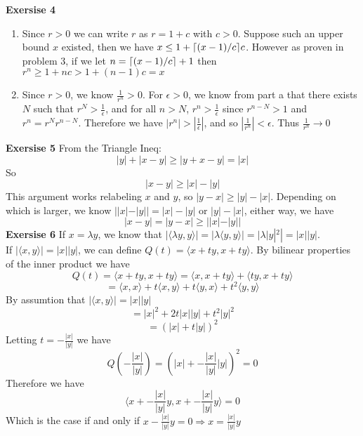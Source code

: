 \documentclass[12pt]{article}
\newcounter{ques}[section]
\newenvironment{ques}[1]{\textbf{Exersise #1} \vspace{1mm}}{\medskip}
\theoremstyle{definition}
\DeclarePairedDelimiter{\ceil}{\lceil}{\rceil}
\begin{document}
\begin{ques}{4}
\begin{enumerate}
		\item
			Since $r>0$ we can write $r$ as $r = 1 + c$ with $c >
			0$. Suppose such an upper bound $x$ existed, then we
			have $x \leq 1 + \ceil{(x - 1)/c}c$. However as proven
			in problem 3, if we let $n = \ceil{(x - 1)/c} + 1$ then
			$r^n \geq 1 + nc > 1 + (n - 1)c = x$
		\item
			Since $r > 0$, we know $\frac 1 {r^n} > 0$. For
			$\epsilon > 0$, we know from part a that there exists
			$N$ such that $r^N > \frac 1 \epsilon$, and for all $n
			> N$, $r^n > \frac 1 \epsilon$ since $r^{n-N} > 1$ and
			$r^n = r^Nr^{n-N}$.
			Therefore we have $|r^n| > |\frac 1 \epsilon|$, and so
			$|\frac 1 {r^n}| < \epsilon$. Thus $\frac 1 {r^n} \to
			0$

	\end{enumerate}
\end{ques}
\begin{ques}{5}
	From the Triangle Ineq:
	$$|y| + |x - y| \geq |y + x - y| = |x|$$
	So
	$$|x - y| \geq |x| - |y|$$
	This argument works relabeling $x$ and $y$, so $|y - x| \geq |y| -
	|x|$. Depending on which is larger, we know $||x| - |y|| = |x| - |y|$
	or $|y| - |x|$, either way, we have
	$$|x- y| = |y-x| \geq ||x| - |y||$$
\end{ques}
\begin{ques}{6}
	If $x = \lambda y$, we know that $|\langle \lambda y, y \rangle | =
	|\lambda \langle y, y \rangle | = |\lambda |y|^2| = |x||y|$. \\
	If $|\langle x, y\rangle | = |x||y|$, we can define $Q(t) = \langle x +
	ty, x + ty\rangle$. By bilinear properties of the inner product we have
	$$Q(t) = \langle x + ty, x + ty\rangle = \langle x, x + ty \rangle +
	\langle ty, x + ty \rangle$$ 
	$$= \langle x, x \rangle  + t\langle x, y \rangle + t\langle y, x
	\rangle + t^2\langle y, y \rangle$$
	By assumtion that $|\langle x, y\rangle | = |x||y|$
	$$= |x|^2 + 2t|x||y| + t^2|y|^2$$
	$$= (|x| + t|y|)^2$$
	Letting $t = -\frac {|x|}{|y|}$ we have
	$$Q(-\frac {|x|}{|y|}) = \left(|x| + -\frac {|x|}{|y|}|y|\right)^2 = 0$$
	Therefore we have
	$$\langle x + -\frac {|x|}{|y|}y, x + -\frac {|x|}{|y|}y\rangle = 0$$
	Which is the case if and only if $x  -\frac {|x|}{|y|}y = 0
	\Rightarrow x = \frac {|x|}{|y|}y$


\end{ques}
\end{document}
